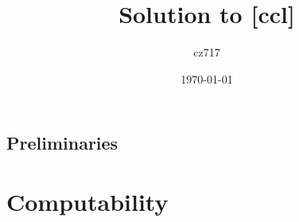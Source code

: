 \documentclass[a4paper]{report}
\begin{document}
  \title{Solution to [ccl]}
  \author{cz717}
  \date{\today}
  \maketitle



  \chapter{Preliminaries}
\part{Computability}
  
\end{document}
